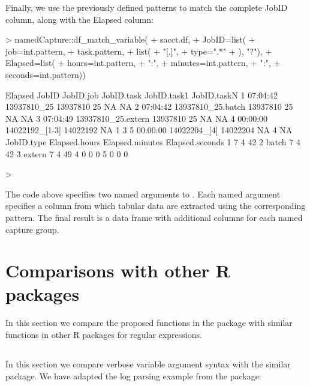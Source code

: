 Finally, we use the previously defined patterns to match the complete JobID
column, along with the Elapsed column:

\begin{Schunk}
\begin{Sinput}
> namedCapture::df_match_variable(
+   sacct.df,
+   JobID=list(
+     job=int.pattern,
+     task.pattern,
+     list(
+       "[.]",
+       type=".*"
+     ), "?"),
+   Elapsed=list(
+     hours=int.pattern,
+     ":",
+     minutes=int.pattern,
+     ":",
+     seconds=int.pattern))
\end{Sinput}
\begin{Soutput}
   Elapsed              JobID JobID.job JobID.task JobID.task1 JobID.taskN
1 07:04:42        13937810_25  13937810         25          NA          NA
2 07:04:42  13937810_25.batch  13937810         25          NA          NA
3 07:04:49 13937810_25.extern  13937810         25          NA          NA
4 00:00:00     14022192_[1-3]  14022192         NA           1           3
5 00:00:00       14022204_[4]  14022204         NA           4          NA
  JobID.type Elapsed.hours Elapsed.minutes Elapsed.seconds
1                        7               4              42
2      batch             7               4              42
3     extern             7               4              49
4                        0               0               0
5                        0               0               0
\end{Soutput}
\begin{Sinput}
> 
\end{Sinput}
\end{Schunk}

The code above specifies two named arguments to
. Each named argument specifies a column from
which tabular data are extracted using the corresponding pattern. The
final result is a data frame with additional columns for each named
capture group. 

\section{Comparisons with other R packages}
\label{sec:comparisons}

In this section we compare the proposed functions in the 
package with similar functions in other R packages for regular expressions.

\subsection{\sectionrex}
\label{sec:rex}
In this section we compare  verbose variable argument
syntax with the similar  package. We have adapted the log
parsing example from the  package:

